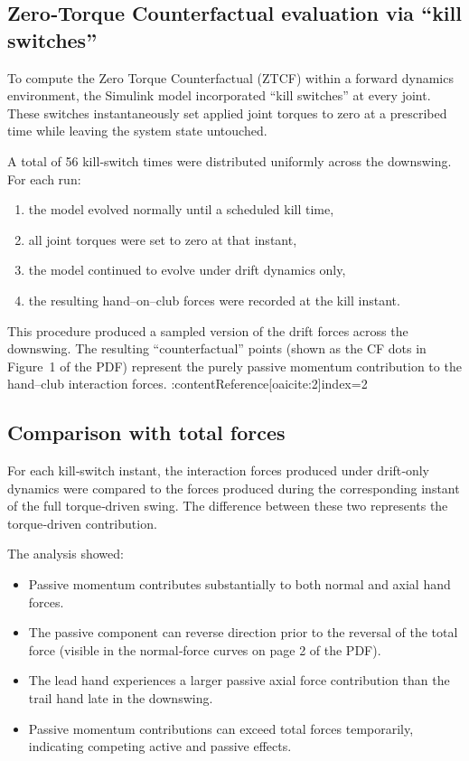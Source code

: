 \documentclass[12pt]{article}
\begin{document}
\subsection{Zero‐Torque Counterfactual evaluation via “kill switches”}

To compute the Zero Torque Counterfactual (ZTCF) within a forward dynamics environment, the Simulink model incorporated “kill switches” at every joint. These switches instantaneously set applied joint torques to zero at a prescribed time while leaving the system state untouched.

A total of 56 kill‐switch times were distributed uniformly across the downswing. For each run:
\begin{enumerate}
  \item the model evolved normally until a scheduled kill time,
  \item all joint torques were set to zero at that instant,
  \item the model continued to evolve under drift dynamics only,
  \item the resulting hand–on–club forces were recorded at the kill instant.
\end{enumerate}

This procedure produced a sampled version of the drift forces across the downswing. The resulting “counterfactual” points (shown as the CF dots in Figure~1 of the PDF) represent the purely passive momentum contribution to the hand–club interaction forces. :contentReference[oaicite:2]{index=2}

\subsection{Comparison with total forces}

For each kill‐switch instant, the interaction forces produced under drift‐only dynamics were compared to the forces produced during the corresponding instant of the full torque‐driven swing. The difference between these two represents the torque‐driven contribution.

The analysis showed:
\begin{itemize}
  \item Passive momentum contributes substantially to both normal and axial hand forces.
  \item The passive component can reverse direction prior to the reversal of the total force (visible in the normal‐force curves on page 2 of the PDF). 
  \item The lead hand experiences a larger passive axial force contribution than the trail hand late in the downswing.
  \item Passive momentum contributions can exceed total forces temporarily, indicating competing active and passive effects.
\end{itemize}
\end{document}
